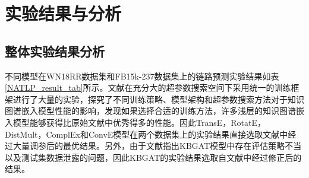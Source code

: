 \section{实验结果与分析}

\subsection{整体实验结果分析}

不同模型在WN18RR数据集和FB15k-237数据集上的链路预测实验结果如表\ref{NATLP_result_tab}所示。文献\cite{49}在充分大的超参数搜索空间下采用统一的训练框架进行了大量的实验，探究了不同训练策略、模型架构和超参数搜索方法对于知识图谱嵌入模型性能的影响，发现如果选择合适的训练方法，许多浅层的知识图谱嵌入模型能够获得比原始文献中优秀得多的性能。因此TransE，RotatE，DistMult，ComplEx和ConvE模型在两个数据集上的实验结果直接选取文献\cite{49}中经过大量调参后的最优结果。另外，由于文献\cite{50}指出KBGAT模型中存在评估策略不当以及测试集数据泄露的问题，因此KBGAT的实验结果选取自文献\cite{50}中经过修正后的结果。

